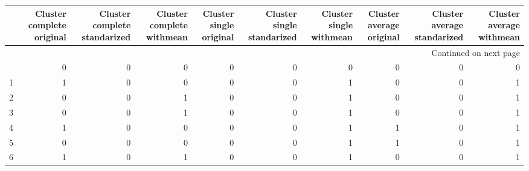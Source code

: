 \begin{longtable}{lrrrrrrrrr}
\toprule
{} &  Cluster complete original &  Cluster complete standarized &  Cluster complete withmean &  Cluster single original &  Cluster single standarized &  Cluster single withmean &  Cluster average original &  Cluster average standarized &  Cluster average withmean \\
\midrule
\endhead
\midrule
\multicolumn{10}{r}{{Continued on next page}} \\
\midrule
\endfoot

\bottomrule
\endlastfoot
0     &                          0 &                             0 &                          0 &                        0 &                           0 &                        0 &                         0 &                            0 &                         0 \\
1     &                          1 &                             0 &                          0 &                        0 &                           0 &                        1 &                         0 &                            0 &                         1 \\
2     &                          0 &                             0 &                          1 &                        0 &                           0 &                        1 &                         0 &                            0 &                         1 \\
3     &                          0 &                             0 &                          1 &                        0 &                           0 &                        1 &                         0 &                            0 &                         1 \\
4     &                          1 &                             0 &                          0 &                        0 &                           0 &                        1 &                         1 &                            0 &                         1 \\
5     &                          0 &                             0 &                          0 &                        0 &                           0 &                        1 &                         1 &                            0 &                         1 \\
6     &                          1 &                             0 &                          1 &                        0 &                           0 &                        1 &                         0 &                            0 &                         1 \\

\end{longtable}
